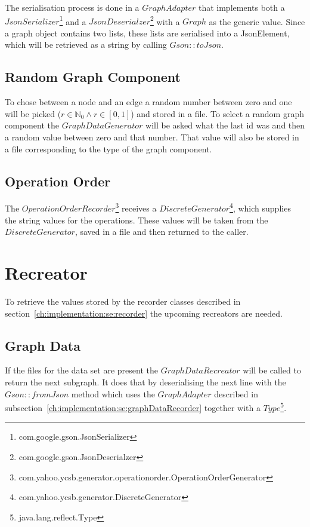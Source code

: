 The serialisation process is done in a $ GraphAdapter $ that implements both a $ JsonSerializer $\footnote{com.google.gson.JsonSerializer} and a $ JsonDeserialzer $\footnote{com.google.gson.JsonDeserialzer} with a $ Graph $ as the generic value.
Since a graph object contains two lists,
these lists are serialised into a JsonElement,
which will be retrieved as a string by calling $ Gson::toJson $.

\subsection{Random Graph Component}
To chose between a node and an edge a random number between zero and one will be picked ($ r \in \mathbb{N}_0 \wedge r \in [ 0, 1 ] $) and stored in a file.
To select a random graph component the $ GraphDataGenerator $ will be asked what the last id was and then a random value between zero and that number.
That value will also be stored in a file corresponding to the type of the graph component.

\subsection{Operation Order}
\label{ch:implementation:se:operationOrderRecorder}
The $ OperationOrderRecorder $\footnote{com.yahoo.ycsb.generator.operationorder.OperationOrderGenerator} receives a $ DiscreteGenerator $\footnote{com.yahoo.ycsb.generator.DiscreteGenerator},
which supplies the string values for the operations.
These values will be taken from the $ DiscreteGenerator $,
saved in a file and then returned to the caller.

\section{Recreator}
\label{ch:implementation:se:recreator}
To retrieve the values stored by the recorder classes described in section~\ref{ch:implementation:se:recorder} the upcoming recreators are needed.

\subsection{Graph Data}
If the files for the data set are present the $ GraphDataRecreator $ will be called to return the next subgraph.
It does that by deserialising the next line with the $ Gson::fromJson $ method which uses the $ GraphAdapter $ described in subsection~\ref{ch:implementation:se:graphDataRecorder} together with a $ Type $\footnote{java.lang.reflect.Type}.

